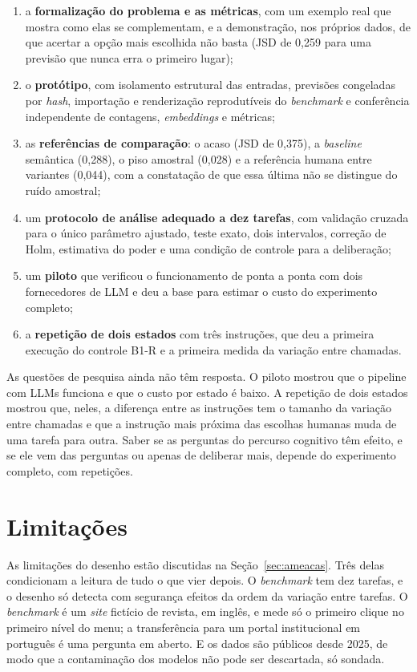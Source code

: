 \documentclass[12pt,oneside,a4paper,chapter=TITLE,english,brazil]{abntex2}
\begin{document}
\begin{enumerate}
\item a \textbf{formalização do problema e as métricas}, com um exemplo real que mostra como elas se complementam, e a demonstração, nos próprios dados, de que acertar a opção mais escolhida não basta (JSD de 0,259 para uma previsão que nunca erra o primeiro lugar);
\item o \textbf{protótipo}, com isolamento estrutural das entradas, previsões congeladas por \textit{hash}, importação e renderização reprodutíveis do \textit{benchmark} e conferência independente de contagens, \textit{embeddings} e métricas;
\item as \textbf{referências de comparação}: o acaso (JSD de 0,375), a \textit{baseline} semântica (0,288), o piso amostral (0,028) e a referência humana entre variantes (0,044), com a constatação de que essa última não se distingue do ruído amostral;
\item um \textbf{protocolo de análise adequado a dez tarefas}, com validação cruzada para o único parâmetro ajustado, teste exato, dois intervalos, correção de Holm, estimativa do poder e uma condição de controle para a deliberação;
\item um \textbf{piloto} que verificou o funcionamento de ponta a ponta com dois fornecedores de LLM e deu a base para estimar o custo do experimento completo;
\item a \textbf{repetição de dois estados} com três instruções, que deu a primeira execução do controle B1-R e a primeira medida da variação entre chamadas.
\end{enumerate}

As questões de pesquisa ainda não têm resposta. O piloto mostrou que o pipeline com LLMs funciona e que o custo por estado é baixo. A repetição de dois estados mostrou que, neles, a diferença entre as instruções tem o tamanho da variação entre chamadas e que a instrução mais próxima das escolhas humanas muda de uma tarefa para outra. Saber se as perguntas do percurso cognitivo têm efeito, e se ele vem das perguntas ou apenas de deliberar mais, depende do experimento completo, com repetições.

\section{Limitações}

As limitações do desenho estão discutidas na Seção~\ref{sec:ameacas}. Três delas condicionam a leitura de tudo o que vier depois. O \textit{benchmark} tem dez tarefas, e o desenho só detecta com segurança efeitos da ordem da variação entre tarefas. O \textit{benchmark} é um \textit{site} fictício de revista, em inglês, e mede só o primeiro clique no primeiro nível do menu; a transferência para um portal institucional em português é uma pergunta em aberto. E os dados são públicos desde 2025, de modo que a contaminação dos modelos não pode ser descartada, só sondada.
\end{document}
